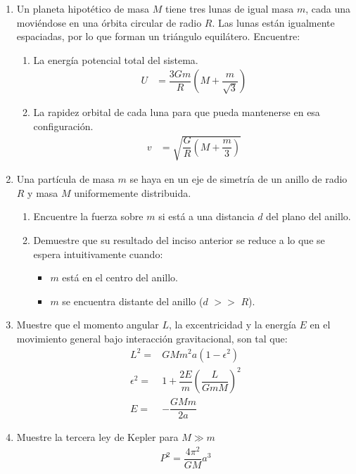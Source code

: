 \documentclass[11pt,twocolumn]{article}
\begin{document}
\begin{enumerate}
\item Un planeta hipotético de masa $M$ tiene tres lunas de igual masa $m$, cada una moviéndose en una órbita circular de radio $R$. Las lunas están igualmente espaciadas, por lo que forman un triángulo equilátero. Encuentre:
\begin{enumerate}
\item La energía potencial total del sistema.
\begin{align*}
U&=\dfrac{3Gm}{R}\left(M+\dfrac{m}{\sqrt{3}}\right)
\end{align*}
\item La rapidez orbital de cada luna para que pueda mantenerse en esa configuración.
\begin{align*}
v&=\sqrt{\dfrac{G}{R}\left(M+\dfrac{m}{3}\right)}
\end{align*}
\end{enumerate}



\item Una partícula de masa $m$ se haya en un eje de simetría de un anillo de radio $R$ y masa $M$ uniformemente distribuida.
\begin{enumerate}
\item Encuentre la fuerza sobre $m$ si está a una distancia $d$ del plano del anillo.
\item Demuestre que su resultado del inciso anterior se reduce a lo que se espera intuitivamente cuando:
\begin{itemize}
\item $m$ está en el centro del anillo.
\item $m$ se encuentra distante del anillo ($d$ $>>$ $R$). 
\end{itemize}
\end{enumerate}


\item Muestre que el momento angular $L$, la excentricidad  y la energía $E$ en el movimiento general bajo interacción gravitacional, son tal que:
\begin{align*}
L^2=&GMm^2a(1-\epsilon^2)\\
\epsilon^2=&1+\dfrac{2E}{m}\left(\dfrac{L}{GmM}\right)^2\\
E=&-\dfrac{GMm}{2a}
\end{align*}

\item Muestre la tercera ley de Kepler para $M\gg m$
\begin{align*}
P^2=\dfrac{4\pi^2}{GM}a^3
\end{align*}


\end{enumerate}
\end{document}
